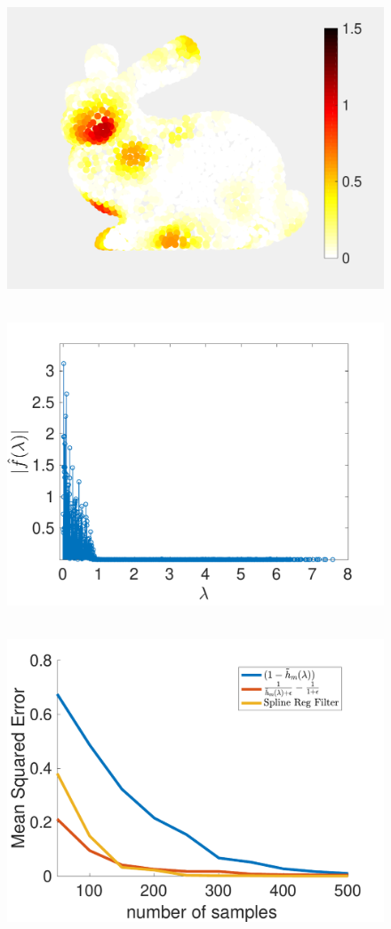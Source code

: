 \documentclass[a4paper]{article}
\theoremstyle{definition}
\begin{document}
\begin{figure}[bth]
\begin{minipage}[m]{0.16\linewidth}
\end{minipage}
\begin{minipage}[m]{0.16\linewidth}
\centerline{~~\includegraphics[width=.85\linewidth]{fig_spline_filter_error_low_pass_bunny}}
\end{minipage}
\begin{minipage}[m]{0.16\linewidth}
\centerline{~~\includegraphics[width=.85\linewidth]{fig_spline_filter_error_spectral_low_pass_bunny}}
\end{minipage}
\begin{minipage}[m]{0.16\linewidth}
\centerline{~~\includegraphics[width=.85\linewidth]{fig_samlpes_error_trade_off_low_pass}}

\end{minipage}
\end{figure}
\end{document}

